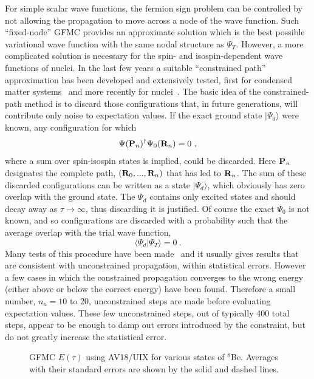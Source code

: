 For simple scalar wave functions, the fermion sign problem can be controlled
by not allowing the propagation to move across a node of the wave function.
Such ``fixed-node'' GFMC provides an approximate solution which is the
best possible variational wave function with the same nodal structure 
as $\Psi_T$.
However, a more complicated
solution is necessary for the spin- and isospin-dependent wave functions
of nuclei.  In the last few years a suitable ``constrained path''
approximation has been developed and extensively tested, first for condensed
matter systems~\cite{ZCG95} and more recently for nuclei~\cite{WPCP00}.
The basic idea of the constrained-path method is to discard those 
configurations that, in future generations, will contribute only noise to 
expectation values.  
If the exact ground state $| \Psi_0 \rangle$ were known,
any configuration for which
\begin{equation}
\Psi({\bf P}_n)^\dagger \Psi_0({\bf R}_n) = 0 \ ,
\label{eq:gfmc:const_config}
\end{equation}
where a sum over spin-isospin states is implied, could be discarded.
Here ${\bf P}_n$ designates the complete path, $({\bf R}_0, ..., {\bf R}_n)$
that has led to ${\bf R}_n$.
The sum of these discarded
configurations can be written as a state $| \Psi_d \rangle$,
which obviously has zero overlap with the ground state.
The $\Psi_d$ contains only excited states and should decay away as 
$\tau \rightarrow \infty$, thus discarding it is justified. 
Of course the exact $\Psi_0$ is not known, and so configurations
are discarded with a probability such that the average overlap
with the trial wave function, 
\begin{equation}
\langle \Psi_d | \Psi_T \rangle = 0 \ .
\end{equation}
Many tests of this procedure have been made~\cite{WPCP00} and it usually gives
results that are consistent with unconstrained propagation, within statistical errors.
However a few cases in which the constrained propagation converges to the
wrong energy (either above or below the correct energy) have been found.
Therefore a small number, $n_u=10$ to 20, unconstrained steps are made
before evaluating expectation values.  These few unconstrained steps,
out of typically 400 total steps,
appear to be enough to damp out errors introduced by the constraint,
but do not greatly increase the statistical error.  


\begin{figure}
\centerline{}
\caption{GFMC $E(\tau)$ using AV18/UIX for various states of $^8$Be.
Averages with their standard errors are shown by the solid and dashed lines.}
\label{fig:8be-e_of_tau}
\end{figure}

